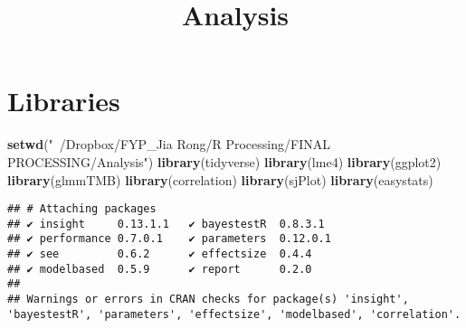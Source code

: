 \documentclass[
]{article}
\title{Analysis}
\author{}
\date{\vspace{-2.5em}}
\newenvironment{Shaded}{\begin{snugshade}}{\end{snugshade}}
\newcommand{\KeywordTok}[1]{\textcolor[rgb]{0.13,0.29,0.53}{\textbf{#1}}}
\newcommand{\NormalTok}[1]{#1}
\newcommand{\StringTok}[1]{\textcolor[rgb]{0.31,0.60,0.02}{#1}}
\begin{document}
\maketitle

\hypertarget{libraries}{%
\section{Libraries}\label{libraries}}

\begin{Shaded}
\begin{Highlighting}[]
\KeywordTok{setwd}\NormalTok{(}\StringTok{"~/Dropbox/FYP_Jia Rong/R Processing/FINAL PROCESSING/Analysis"}\NormalTok{)}
\KeywordTok{library}\NormalTok{(tidyverse)}
\KeywordTok{library}\NormalTok{(lme4)}
\KeywordTok{library}\NormalTok{(ggplot2)}
\KeywordTok{library}\NormalTok{(glmmTMB)}
\KeywordTok{library}\NormalTok{(correlation)}
\KeywordTok{library}\NormalTok{(sjPlot)}
\KeywordTok{library}\NormalTok{(easystats)}
\end{Highlighting}
\end{Shaded}

\begin{verbatim}
## # Attaching packages
## ✔ insight     0.13.1.1   ✔ bayestestR  0.8.3.1 
## ✔ performance 0.7.0.1    ✔ parameters  0.12.0.1
## ✔ see         0.6.2      ✔ effectsize  0.4.4   
## ✔ modelbased  0.5.9      ✔ report      0.2.0   
## 
## Warnings or errors in CRAN checks for package(s) 'insight', 'bayestestR', 'parameters', 'effectsize', 'modelbased', 'correlation'.
\end{verbatim}
\end{document}
